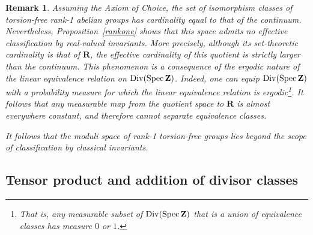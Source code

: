 \documentclass[11pt,a4paper]{article}
\newcommand{\Z}{\mathbf{Z}}
\newcommand{\R}{\mathbf{R}}
\def\spz{\Spec \Z}
\newcommand{\Spec}{\operatorname{Spec}}
\def\Div{{\rm Div}}
\def\spz{\Spec \Z}
\theoremstyle{plain}
\newtheorem{rem}[thm]{Remark}
\theoremstyle{definition} %
\begin{document}
\begin{rem}\label{choice} 
Assuming the Axiom of Choice, the set of isomorphism classes of torsion-free
rank-1 abelian groups has cardinality equal to that of the continuum.
Nevertheless, Proposition~\ref{rankone} shows that this space admits no effective
classification by real-valued invariants.
More precisely, although its set-theoretic cardinality is that of $\R$, the
\emph{effective cardinality} of this quotient is strictly larger than the continuum.
This phenomenon is a consequence of the ergodic nature of the linear equivalence
relation on $\Div(\spz)$.
Indeed, one can equip $\Div(\spz)$ with a probability measure for which the linear
equivalence relation is ergodic\footnote{That is, any measurable subset of
$\Div(\spz)$ that is a union of equivalence classes has measure $0$ or $1$.}.
It follows that any measurable map from the quotient space to $\R$ is almost
everywhere constant, and therefore cannot separate equivalence classes.

It follows that the moduli space of rank-1 torsion-free groups lies beyond the
scope of classification by classical invariants.

\end{rem} 





\subsection{Tensor product and addition of divisor classes}
\end{document}
